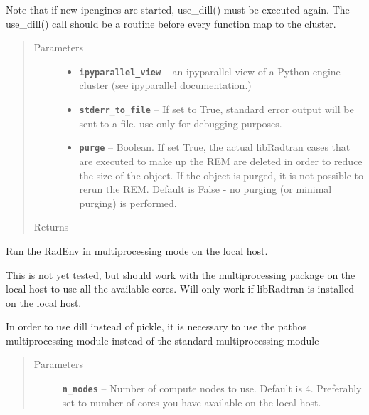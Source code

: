 \documentclass[a4paper,10pt,english]{sphinxmanual}
\begin{document}
\begin{fulllineitems}
\begin{fulllineitems}
Note that if new ipengines are started, use\_dill() must be executed again. The use\_dill() call
should be a routine before every function map to the cluster.
\begin{quote}\begin{description}
\item[{Parameters}] \leavevmode\begin{itemize}
\item {} 
\textbf{\texttt{ipyparallel\_view}} -- an ipyparallel view of a Python engine cluster (see ipyparallel documentation.)

\item {} 
\textbf{\texttt{stderr\_to\_file}} -- If set to True, standard error output will be sent to a file. use only for debugging
purposes.

\item {} 
\textbf{\texttt{purge}} -- Boolean. If set True, the actual libRadtran cases that are executed to make up the REM are
deleted in order to reduce the size of the object. If the object is purged, it is not possible to rerun
the REM. Default is False - no purging (or minimal purging) is performed.

\end{itemize}

\item[{Returns}] \leavevmode


\end{description}\end{quote}

\end{fulllineitems}


\begin{fulllineitems}
\label{packages:librad.RadEnv.run_parallel}
Run the RadEnv in multiprocessing mode on the local host.

This is not yet tested, but should work with the multiprocessing package on the local host to use all
the available cores. Will only work if libRadtran is installed on the local host.

In order to use dill instead of pickle, it is necessary to use the pathos multiprocessing module
instead of the standard multiprocessing module
\begin{quote}\begin{description}
\item[{Parameters}] \leavevmode
\textbf{\texttt{n\_nodes}} -- Number of compute nodes to use. Default is 4. Preferably set to number of cores you have
available on the local host.


\end{description}
\end{quote}
\end{fulllineitems}
\end{fulllineitems}
\end{document}
